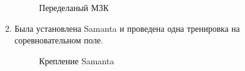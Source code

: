 \begin{enumerate}
\begin{figure}[H]
\begin{minipage}[h]{0.9\linewidth}
		\end{minipage}
		\caption{Переделаный МЗК}
	\end{figure}		
	\item Была установлена Samanta и проведена одна тренировка на соревновательном поле.
	\begin{figure}[H]
		\begin{minipage}[h]{1\linewidth}
		\end{minipage}
		\caption{Крепление Samanta}
	\end{figure}	
\end{enumerate}

\fillpage